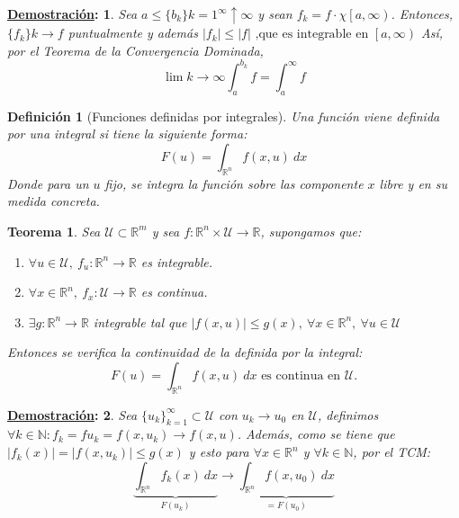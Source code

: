 \documentclass[10pt,a4paper,openright]{book}
\theoremstyle{break}
\newtheorem*{defi}{Definición}
\newtheorem*{theo}{Teorema}
\newtheorem*{demo}{\underline{Demostración}:}
\newcommand{\dif}[1]{\ d#1}
\begin{document}
\begin{demo}
Sea $a \le \{b_k\}{k=1}^{\infty}\uparrow \infty$ y sean $f_k = f \cdot \chi{\left[a, \infty\right)}$. Entonces, $ \{f_k\}k \rightarrow f$ puntualmente y además $\vert f_k \vert \le \vert f \vert \text{ ,que es integrable en } \left[a, \infty\right)$ Así, por el Teorema de la Convergencia Dominada, $$\lim{k \rightarrow \infty} \int_a^{b_k} f = \int_a^{\infty} f$$ 
\end{demo}

\begin{defi}[Funciones definidas por integrales]
Una función viene definida por una integral si tiene la siguiente forma: 
$$F \left(u\right) = \int_{\mathbb{R}^n} f \left(x, u\right) \dif{x} $$
Donde para un $u$ fijo, se integra la función sobre las componente $x$ libre y en su medida concreta.
\end{defi}

\begin{theo}
Sea $\mathcal{U} \subset \mathbb{R}^m$ y sea $f: \mathbb{R}^n \times \mathcal{U} \rightarrow \mathbb{R}$, supongamos que: 
\begin{enumerate}
    \item $\forall u \in \mathcal{U},\ f_{u}: \mathbb{R}^n \rightarrow \mathbb{R}$ es integrable.
    \item $\forall x \in \mathbb{R}^n,\ f_x: \mathcal{U} \rightarrow \mathbb{R}$ es continua.
    \item $\exists g: \mathbb{R}^n \rightarrow \mathbb{R}$ integrable tal que $\vert f \left(x, u\right) \vert \le g \left(x\right),\ \forall x \in \mathbb{R}^n,\ \forall u \in \mathcal{U}$
\end{enumerate}
Entonces se verifica la continuidad de la definida por la integral: 
$$F \left(u\right) = \int_{\mathbb{R}^n} f \left(x, u\right) \dif{x} \text{ es continua en } \mathcal{U}.$$
\end{theo}
\begin{demo}
Sea $\{u_k\}_{k=1}^{\infty} \subset \mathcal{U}$ con $u_k \rightarrow u_0$ en $\mathcal{U}$, definimos $\forall k \in \mathbb{N}: f_k = f{u_k} = f \left(x, u_k\right) \rightarrow f \left(x, u\right)$. Además, como se tiene que $\vert f_k \left(x\right) \vert = \vert f \left(x, u_k\right) \vert \le g \left(x\right)$ y esto para $\forall x \in \mathbb{R}^n$ y $\forall k \in \mathbb{N}$, por el TCM: 
$$\underbrace{\int_{\mathbb{R}^n} f_k \left(x\right) \dif{x}}_{F \left(u_k\right)} \rightarrow \underbrace{\int_{\mathbb{R}^n} f \left(x, u_0\right) \dif{x}}_{= F \left(u_0\right)} $$
\end{demo}
\end{document}
